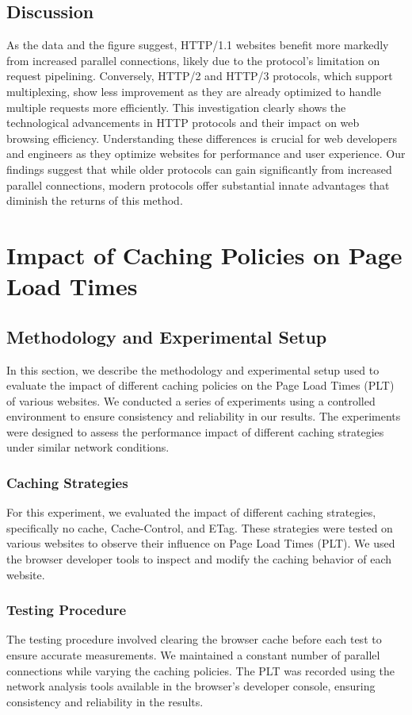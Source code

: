 \documentclass[a4paper,10pt]{article}
\begin{document}
\subsection{Discussion}
As the data and the figure suggest, HTTP/1.1 websites benefit more markedly from increased parallel connections, likely due to the protocol's limitation on request pipelining. Conversely, HTTP/2 and HTTP/3 protocols, which support multiplexing, show less improvement as they are already optimized to handle multiple requests more efficiently. This investigation clearly shows the technological advancements in HTTP protocols and their impact on web browsing efficiency. Understanding these differences is crucial for web developers and engineers as they optimize websites for performance and user experience. Our findings suggest that while older protocols can gain significantly from increased parallel connections, modern protocols offer substantial innate advantages that diminish the returns of this method.

\section{Impact of Caching Policies on Page Load Times}

\subsection{Methodology and Experimental Setup}
In this section, we describe the methodology and experimental setup used to evaluate the impact of different caching policies on the Page Load Times (PLT) of various websites. We conducted a series of experiments using a controlled environment to ensure consistency and reliability in our results. The experiments were designed to assess the performance impact of different caching strategies under similar network conditions.


\subsubsection{Caching Strategies}
For this experiment, we evaluated the impact of different caching strategies, specifically no cache, Cache-Control, and ETag. These strategies were tested on various websites to observe their influence on Page Load Times (PLT). We used the browser developer tools to inspect and modify the caching behavior of each website.

\subsubsection{Testing Procedure}
The testing procedure involved clearing the browser cache before each test to ensure accurate measurements. We maintained a constant number of parallel connections while varying the caching policies. The PLT was recorded using the network analysis tools available in the browser's developer console, ensuring consistency and reliability in the results.
\end{document}
